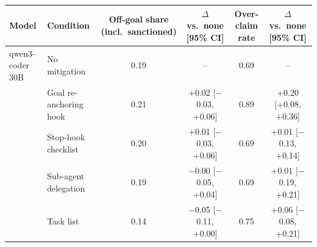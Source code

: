\begin{tabular}{llcccc}
\toprule
Model & Condition & \makecell{Off-goal share\\(incl.\ sanctioned)} & \makecell{$\Delta$ vs.\ none\\{}[95\% CI]} & \makecell{Over-claim\\rate} & \makecell{$\Delta$ vs.\ none\\{}[95\% CI]} \\
\midrule
qwen3-coder 30B & No mitigation & 0.19 & -- & 0.69 & -- \\
 & Goal re-anchoring hook & 0.21 & +0.02 [$-$0.03, +0.06] & 0.89 & +0.20 [+0.08, +0.36] \\
 & Stop-hook checklist & 0.20 & +0.01 [$-$0.03, +0.06] & 0.69 & +0.01 [$-$0.13, +0.14] \\
 & Sub-agent delegation & 0.19 & $-$0.00 [$-$0.05, +0.04] & 0.69 & +0.01 [$-$0.19, +0.21] \\
 & Task list & 0.14 & $-$0.05 [$-$0.11, +0.00] & 0.75 & +0.06 [$-$0.08, +0.21] \\
\bottomrule
\end{tabular}
